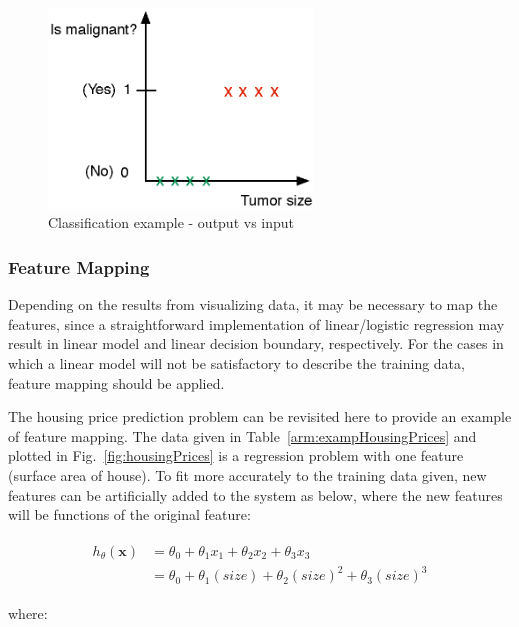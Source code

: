\begin{figure}
\begin{center}
\includegraphics[width=7cm]{figures/classificationEx1}    %
\caption{Classification example - output vs input} 
\label{fig:classificationEx1}
\end{center}
\end{figure}


\subsubsection{Feature Mapping}

Depending on the results from visualizing data, it may be necessary to map the features, since a straightforward implementation of linear/logistic regression may result in linear model and linear decision boundary, respectively. 
For the cases in which a linear model will not be satisfactory to describe the training data, feature mapping should be applied.

The housing price prediction problem can be revisited here to provide an example of feature mapping.
The data given in Table~\ref{arm:exampHousingPrices} and plotted in Fig.~\ref{fig:housingPrices} is a regression problem with one feature (surface area of house).
To fit more accurately to the training data given, new features can be artificially added to the system as below, where the new features will be functions of the original feature:

\begin{align}
\label{eqn:costFuncExamp1}
\begin{split}
h_{\theta}(\bm{x}) & = \theta_0 + \theta_1 x_1 + \theta_2 x_2 + \theta_3 x_3
\\
& = \theta_0 + \theta_1 (size) + \theta_2 {(size)}^2 + \theta_3 {(size)}^3
\end{split}
\end{align}

where:

